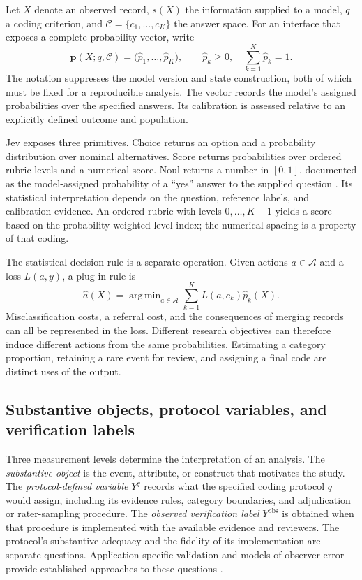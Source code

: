 \documentclass[11pt,a4paper]{article}
\DeclareMathOperator*{\argmin}{arg\,min}
\begin{document}
Let $X$ denote an observed record, $s(X)$ the information supplied to a model, $q$ a coding criterion, and $\mathcal C=\{c_1,\ldots,c_K\}$ the answer space. For an interface that exposes a complete probability vector, write
\begin{equation}
 \widehat{\boldsymbol p}(X;q,\mathcal C)
 =\bigl(\widehat p_1,\ldots,\widehat p_K\bigr),\qquad
 \widehat p_k\geq0,\quad \sum_{k=1}^{K}\widehat p_k=1.
 \label{eq:interface}
\end{equation}
The notation suppresses the model version and state construction, both of which must be fixed for a reproducible analysis. The vector records the model's assigned probabilities over the specified answers. Its calibration is assessed relative to an explicitly defined outcome and population.

Jev exposes three primitives. Choice returns an option and a probability distribution over nominal alternatives. Score returns probabilities over ordered rubric levels and a numerical score. Noul returns a number in $[0,1]$, documented as the model-assigned probability of a ``yes'' answer to the supplied question \citep{typesafe-intro,typesafe-score,typesafe-noul}. Its statistical interpretation depends on the question, reference labels, and calibration evidence. An ordered rubric with levels $0,\ldots,K-1$ yields a score based on the probability-weighted level index; the numerical spacing is a property of that coding.

The statistical decision rule is a separate operation. Given actions $a\in\mathcal A$ and a loss $L(a,y)$, a plug-in rule is
\begin{equation}
 \widehat a(X)=\argmin_{a\in\mathcal A}
 \sum_{k=1}^{K} L(a,c_k)\widehat p_k(X).
 \label{eq:action}
\end{equation}
Misclassification costs, a referral cost, and the consequences of merging records can all be represented in the loss. Different research objectives can therefore induce different actions from the same probabilities. Estimating a category proportion, retaining a rare event for review, and assigning a final code are distinct uses of the output.

\subsection{Substantive objects, protocol variables, and verification labels}\label{sec:measurement-layers}

Three measurement levels determine the interpretation of an analysis. The \emph{substantive object} is the event, attribute, or construct that motivates the study. The \emph{protocol-defined variable} $Y^q$ records what the specified coding protocol $q$ would assign, including its evidence rules, category boundaries, and adjudication or rater-sampling procedure. The \emph{observed verification label} $Y^{\mathrm{obs}}$ is obtained when that procedure is implemented with the available evidence and reviewers. The protocol's substantive adequacy and the fidelity of its implementation are separate questions. Application-specific validation and models of observer error provide established approaches to these questions \citep{grimmer2013,dawid1979}.
\end{document}
